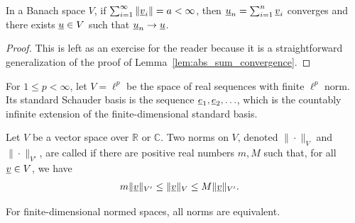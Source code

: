 \begin{lemma} \label{lem:banach_sum_convergence}
In a Banach space $V$, if $\sum_{i=1}^\infty \| \underline{v}_i \| = a < \infty$, then $\underline{u}_n = \sum_{i=1}^n \underline{v}_i$ converges and there exists $\underline{u} \in V$ such that $\underline{u}_n \to \underline{u}$.
\end{lemma}
\begin{proof}
This is left as an exercise for the reader because it is a straightforward generalization of the proof of Lemma~\ref{lem:abs_sum_convergence}.
\end{proof}

\begin{example}
For $1\le p<\infty$, let $V=\ell^p$ be the space of real sequences with finite $\ell^p$ norm.
Its standard Schauder basis is the sequence $\underline e_1,\underline e_2,\ldots$, which is the countably infinite extension of the finite-dimensional standard basis.
\end{example}

\begin{definition}
Let $V$ be a vector space over $\mathbb{R}$ or $\mathbb{C}$.
Two norms on $V$, denoted $\|\cdot\|_{V}$ and $\|\cdot\|_{V'}$, are called  if there are positive real numbers $m,M$ such that, for all $\underline{v} \in V$, we have
\begin{align} \label{equation:EquivNorm}
m \| \underline{v} \|_{V'} & \leq \| \underline{v} \|_V \leq M \| \underline{v} \|_{V'}.
\end{align}
\end{definition}

\begin{lemma} \label{lemma:FiniteDimNormsEquiv}
For finite-dimensional normed spaces, all norms are equivalent.
\end{lemma}

